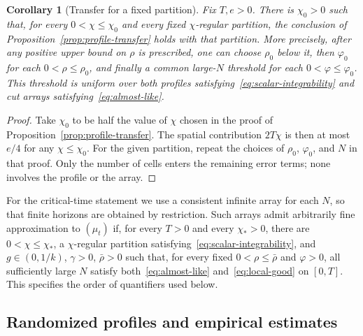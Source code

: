 \documentclass[11pt]{article}
\numberwithin{equation}{section}
\newtheorem{corollary}[theorem]{Corollary}
\theoremstyle{definition}
\theoremstyle{remark}
\newcommand{\1}{\mathbf 1}
\begin{document}
\begin{corollary}[Transfer for a fixed partition]%
\label{cor:fixed-partition-transfer}
Fix $T,e>0$. There is $\chi_0>0$ such that, for every
$0<\chi\le\chi_0$ and every fixed $\chi$-regular partition, the
conclusion of Proposition~\ref{prop:profile-transfer} holds with that
partition. More precisely, after any positive upper bound on $\rho$
is prescribed, one can choose $\rho_0$ below it, then $\varphi_0$
for each $0<\rho\le\rho_0$, and finally a common large-$N$
threshold for each $0<\varphi\le\varphi_0$. This threshold is
uniform over both profiles satisfying~\eqref{eq:scalar-integrability}
and cut arrays satisfying~\eqref{eq:almost-like}.
\end{corollary}

\begin{proof}
Take $\chi_0$ to be half the value of $\chi$ chosen in the proof of
Proposition~\ref{prop:profile-transfer}. The spatial contribution
$2T\chi$ is then at most $e/4$ for any $\chi\le\chi_0$. For the
given partition, repeat the choices of $\rho_0$, $\varphi_0$, and
$N$ in that proof. Only the number of cells enters the remaining
error terms; none involves the profile or the array.
\end{proof}

For the critical-time statement we use a consistent infinite array for
each $N$, so that finite horizons are obtained by restriction. Such
arrays admit arbitrarily fine approximation to $(\mu_t)$ if, for every
$T>0$ and every $\chi_*>0$, there are $0<\chi\le\chi_*$, a
$\chi$-regular partition satisfying~\eqref{eq:scalar-integrability},
and $g\in(0,1/k)$, $\gamma>0$, $\bar\rho>0$ such that, for every
fixed $0<\rho\le\bar\rho$ and $\varphi>0$, all sufficiently large
$N$ satisfy both~\eqref{eq:almost-like} and~\eqref{eq:local-good}
on $[0,T]$. This specifies the order of quantifiers used below.



\subsection{Randomized profiles and empirical estimates}
\end{document}
